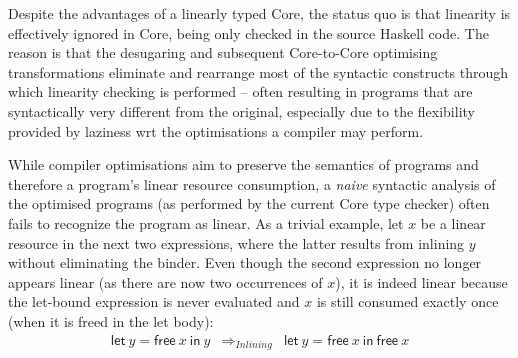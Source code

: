 \documentclass[acmsmall,review,anonymous,screen]{acmart}
\newcommand{\llet}[2]{\mathsf{let}~#1~\mathsf{in}~#2}
\begin{document}

%

Despite the advantages of a linearly typed Core, the status quo is
that linearity is effectively ignored in Core, being only checked
in the source Haskell code. The reason is that the desugaring
and subsequent Core-to-Core optimising transformations
eliminate and rearrange most of the syntactic constructs through
which linearity checking is performed -- often resulting in programs
that are syntactically very different from the original, especially
due to the flexibility provided by laziness wrt the
optimisations a compiler may perform.

While compiler optimisations aim to preserve the semantics of
programs and therefore a program's linear resource consumption,
a \emph{naive} syntactic analysis of the optimised programs (as
performed by the current Core type checker) often fails to recognize
the program as linear.
%
As a trivial example, let $x$ be a linear resource in the next two expressions,
where the latter results from inlining $y$ without eliminating the binder. Even
though the second expression no longer appears linear (as there are now two occurrences
of $x$), it is indeed linear because the let-bound expression is never
evaluated and $x$ is still consumed exactly once (when it is freed in the let body):
%
\[
\begin{array}{ccc}
\llet{y = \textsf{free}~x}{y} & \Longrightarrow_{Inlining} & \llet{y = \textsf{free}~x}{\textsf{free}~x}
\end{array}
\]
\end{document}
